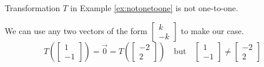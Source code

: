 \documentclass{ximera}
\begin{document}
\begin{example}
Transformation $T$ in Example \ref{ex:notonetoone} is not one-to-one.
\begin{explanation}
We can use any two vectors of the form $\begin{bmatrix}k\\-k\end{bmatrix}$ to make our case.  
$$T\left(\begin{bmatrix}1\\-1\end{bmatrix}\right)=\vec{0}=T\left(\begin{bmatrix}-2\\2\end{bmatrix}\right)\quad \text{but}\quad\begin{bmatrix}1\\-1\end{bmatrix}\neq \begin{bmatrix}-2\\2\end{bmatrix}$$
\end{explanation}
\end{example}
\end{document}

